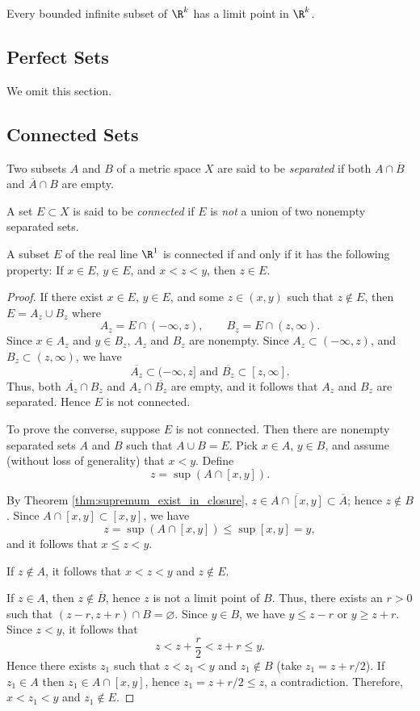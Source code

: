\begin{theorem}[Weierstrass]
Every bounded infinite subset of $\R^k$ has a limit point in $\R^k$.
\end{theorem}

\subsection{Perfect Sets}
We omit this section.

\subsection{Connected Sets}
\begin{definition}
Two subsets $A$ and $B$ of a metric space $X$ are said to be \emph{separated} if both $A \cap \overline{B}$ and $\overline{A} \cap B$ are empty.
    
A set $E \subset X$ is said to be \emph{connected} if $E$ is \emph{not} a union of two nonempty separated sets.
\end{definition}

\begin{theorem}
A subset $E$ of the real line $\R^1$ is connected if and only if it has the following property:
If $x \in E$, $y \in E$, and $x<z<y$, then $z \in E$.
\end{theorem}
\begin{proof}
If there exist $x \in E$, $y \in E$, and some $z \in (x,y)$ such that $z \notin E$, then $E=A_z \cup B_z$ where
\[
A_z = E \cap (-\infty, z), \qquad B_z=E\cap(z,\infty).
\]
Since $x \in A_z$ and $y \in B_z$, $A_z$ and $B_z$ are nonempty.
Since $A_z \subset (-\infty, z)$, and $B_z \subset (z, \infty)$, we have
\[
\overline{A_z} \subset (-\infty, z] \text{ and } \overline{B_z} \subset [z, \infty].
\]
Thus, both $\overline{A_z} \cap B_z$ and $A_z \cap \overline{B_z}$ are empty, and it follows that $A_z$ and $B_z$ are separated.
Hence $E$ is not connected.

To prove the converse,  suppose $E$ is not connected.
Then there are nonempty separated sets $A$ and $B$ such that $A \cup B = E$.
Pick $x \in A$, $y \in B$, and assume (without loss of generality) that $x<y$.
Define
\[
z= \sup (A \cap [x,y]).
\]

By Theorem \ref{thm:supremum_exist_in_closure}, $z \in \overline{A \cap [x,y]} \subset \overline{A}$; hence $z \notin B$.
Since $A \cap [x,y] \subset [x,y]$, we have
\[
z = \sup (A \cap [x,y])\leq \sup [x,y] = y,
\]
and it follows that $x \leq z < y$.

If $z \notin A$, it follows that $x<z<y$ and $z \notin E$.

If $z \in A$, then $z \notin \overline{B}$, hence $z$ is not a limit point of $B$.
Thus, there exists an $r >0$ such that $(z-r,z+r) \cap B = \varnothing$.
Since $y \in B$, we have $y \leq z-r$ or $y \geq z+r$.
Since $z<y$, it follows that 
\[
z< z+\frac{r}{2} < z+r \leq y.
\]
Hence there exists $z_1$ such that $z<z_1<y$ and $z_1 \notin B$ (take $z_1 = z+r/2$).
If $z_1 \in A$ then $z_1 \in A \cap [x,y]$, hence $z_1=z+r/2 \leq z$, a contradiction.
Therefore, $x<z_1<y$ and $z_1 \notin E$.
\end{proof}
